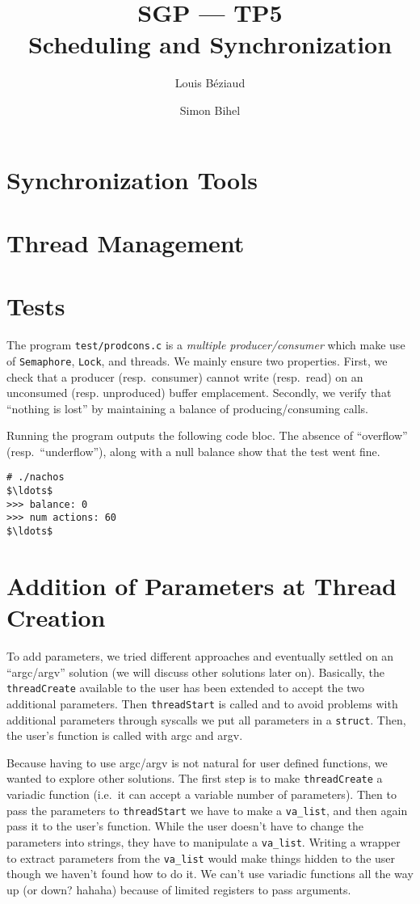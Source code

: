 \documentclass[a4paper,11pt,english]{article}
\title{SGP --- TP5\\Scheduling and Synchronization}
\author{Louis Béziaud \and Simon Bihel}
\begin{document}
\maketitle

\section{Synchronization Tools}


\section{Thread Management}


\section{Tests}
The program \texttt{test/prodcons.c} is a \textit{multiple producer/consumer} which make use of \texttt{Semaphore}, \texttt{Lock}, and threads. We mainly ensure two properties. First, we check that a producer (resp.\ consumer) cannot write (resp.\ read) on an unconsumed (resp. unproduced) buffer emplacement. Secondly, we verify that ``nothing is lost'' by maintaining a balance of producing/consuming calls.

Running the program outputs the following code bloc. The absence of ``overflow'' (resp.\ ``underflow''), along with a null balance show that the test went fine.
\begin{lstlisting}[basicstyle=\ttfamily\small,mathescape]
# ./nachos
$\ldots$
>>> balance: 0
>>> num actions: 60
$\ldots$
\end{lstlisting}

\section{Addition of Parameters at Thread Creation}
To add parameters, we tried different approaches and eventually settled on an
``argc/argv'' solution (we will discuss other solutions later on). Basically,
the \texttt{threadCreate} available to the user has been extended to accept the
two additional parameters. Then \texttt{threadStart} is called and to avoid
problems with additional parameters through syscalls we put all parameters in a
\texttt{struct}. Then, the user's function is called with argc and argv.

Because having to use argc/argv is not natural for user defined functions, we
wanted to explore other solutions. The first step is to make
\texttt{threadCreate} a variadic function (i.e.\ it can accept a variable number
of parameters). Then to pass the parameters to \texttt{threadStart} we have to
make a \texttt{va\_list}, and then again pass it to the user's function. While
the user doesn't have to change the parameters into strings, they have to
manipulate a \texttt{va\_list}. Writing a wrapper to extract parameters from the
\texttt{va\_list} would make things hidden to the user though we haven't found
how to do it. We can't use variadic functions all the way up (or down? hahaha)
because of limited registers to pass arguments.
\end{document}
